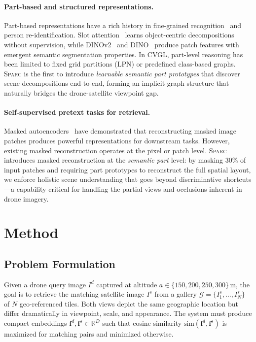 \documentclass[sigconf, anonymous, review]{acmart}
\newcommand{\ours}{\textsc{Sparc}}
\newcommand{\reals}{\mathbb{R}}
\begin{document}
\paragraph{Part-based and structured representations.}
Part-based representations have a rich history in fine-grained recognition~\cite{sun2018beyond} and person re-identification.
Slot attention~\cite{locatello2020slot} learns object-centric decompositions without supervision, while DINOv2~\cite{oquab2024dinov2} and DINO~\cite{caron2021dino} produce patch features with emergent semantic segmentation properties.
In CVGL, part-level reasoning has been limited to fixed grid partitions (LPN) or predefined class-based graphs.
\ours{} is the first to introduce \emph{learnable semantic part prototypes} that discover scene decompositions end-to-end, forming an implicit graph structure that naturally bridges the drone-satellite viewpoint gap.

\paragraph{Self-supervised pretext tasks for retrieval.}
Masked autoencoders~\cite{he2022mae} have demonstrated that reconstructing masked image patches produces powerful representations for downstream tasks.
However, existing masked reconstruction operates at the pixel or patch level.
\ours{} introduces masked reconstruction at the \emph{semantic part} level: by masking 30\% of input patches and requiring part prototypes to reconstruct the full spatial layout, we enforce holistic scene understanding that goes beyond discriminative shortcuts---a capability critical for handling the partial views and occlusions inherent in drone imagery.

\section{Method}
\label{sec:method}

\subsection{Problem Formulation}
\label{sec:problem}

Given a drone query image $I^d$ captured at altitude $a \in \{150, 200, 250, 300\}$\,m, the goal is to retrieve the matching satellite image $I^s$ from a gallery $\mathcal{G} = \{I^s_1, \ldots, I^s_N\}$ of $N$ geo-referenced tiles.
Both views depict the same geographic location but differ dramatically in viewpoint, scale, and appearance.
The system must produce compact embeddings $\mathbf{f}^d, \mathbf{f}^s \in \reals^D$ such that cosine similarity $\text{sim}(\mathbf{f}^d, \mathbf{f}^s)$ is maximized for matching pairs and minimized otherwise.
\end{document}
